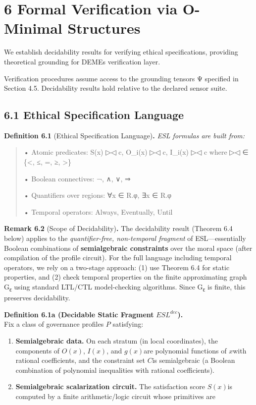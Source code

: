 \documentclass[12pt]{article}
\theoremstyle{plain}
\theoremstyle{definition}
\theoremstyle{remark}
\begin{document}
\section{6 Formal Verification via O-Minimal
Structures}\label{formal-verification-via-o-minimal-structures}

We establish decidability results for verifying ethical specifications,
providing theoretical grounding for DEME\textquotesingle s verification
layer.

Verification procedures assume access to the grounding tensors Ψ
specified in Section 4.5. Decidability results hold relative to the
declared sensor suite.

\subsection{6.1 Ethical Specification
Language}\label{ethical-specification-language}

\textbf{Definition 6.1} (Ethical Specification Language)\textbf{.}
\emph{ESL formulas are built from:}

\begin{quote}
• Atomic predicates: S(x) ▷◁ c, O\_i(x) ▷◁ c, I\_i(x) ▷◁ c where ▷◁ ∈
\{\textless, ≤, =, ≥, \textgreater\}

• Boolean connectives: ¬, ∧, ∨, ⇒

• Quantifiers over regions: ∀x ∈ R.φ, ∃x ∈ R.φ

• Temporal operators: Always, Eventually, Until
\end{quote}

\textbf{Remark 6.2} (Scope of Decidability)\textbf{.} The decidability
result (Theorem 6.4 below) applies to the \emph{quantifier-free,
non-temporal fragment} of ESL---essentially Boolean combinations of
\textbf{semialgebraic constraints} over the moral space (after
compilation of the profile circuit). For the full language including
temporal operators, we rely on a two-stage approach: (1) use Theorem 6.4
for static properties, and (2) check temporal properties on the finite
approximating graph G\textsubscript{ε} using standard LTL/CTL
model-checking algorithms. Since G\textsubscript{ε} is finite, this
preserves decidability.

\textbf{Definition 6.1a (Decidable Static Fragment}
\({ESL}^{dec}\)\textbf{).}\\
Fix a class of governance profiles \(P\) satisfying:

\begin{enumerate}
\item
  \textbf{Semialgebraic data.} On each stratum (in local coordinates),
  the components of \(O(x)\), \(I(x)\), and \(g(x)\)are polynomial
  functions of \(x\)with rational coefficients, and the constraint set
  \(C\)is semialgebraic (a Boolean combination of polynomial
  inequalities with rational coefficients).
\item
  \textbf{Semialgebraic scalarization circuit.} The satisfaction score
  \(S(x)\)is computed by a finite arithmetic/logic circuit whose
  primitives are
\end{enumerate}
\end{document}

